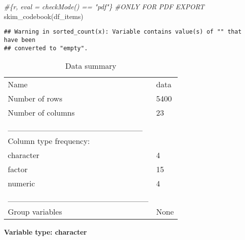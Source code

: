 \documentclass[
]{article}
\newenvironment{Shaded}{\begin{snugshade}}{\end{snugshade}}
\newcommand{\CommentTok}[1]{\textcolor[rgb]{0.56,0.35,0.01}{\textit{#1}}}
\newcommand{\FunctionTok}[1]{\textcolor[rgb]{0.00,0.00,0.00}{#1}}
\newcommand{\NormalTok}[1]{#1}
\begin{document}
\begin{Shaded}
\begin{Highlighting}[]
\CommentTok{\#\{r, eval = checkMode() == "pdf"\} \#ONLY FOR PDF EXPORT}
\FunctionTok{skim\_codebook}\NormalTok{(df\_items) }
\end{Highlighting}
\end{Shaded}

\begin{verbatim}
## Warning in sorted_count(x): Variable contains value(s) of "" that have been
## converted to "empty".
\end{verbatim}

\begin{longtable}[]{@{}ll@{}}
\caption{Data summary}\tabularnewline
\toprule
\endhead
Name & data \\
Number of rows & 5400 \\
Number of columns & 23 \\
\_\_\_\_\_\_\_\_\_\_\_\_\_\_\_\_\_\_\_\_\_\_\_ & \\
Column type frequency: & \\
character & 4 \\
factor & 15 \\
numeric & 4 \\
\_\_\_\_\_\_\_\_\_\_\_\_\_\_\_\_\_\_\_\_\_\_\_\_ & \\
Group variables & None \\
\bottomrule
\end{longtable}

\textbf{Variable type: character}
\end{document}
